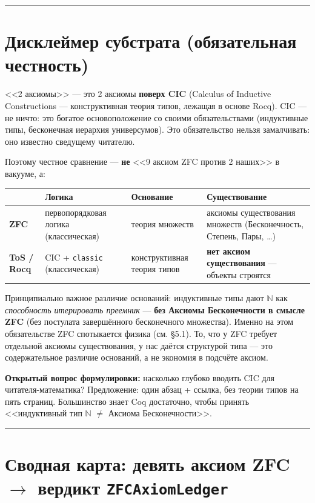 \documentclass[11pt,a4paper]{article}
\begin{document}
\bigskip\hrule\bigskip

\section{Дисклеймер субстрата (обязательная честность)}

<<2 аксиомы>> --- это 2 аксиомы \textbf{поверх CIC} (Calculus of Inductive Constructions --- конструктивная теория типов, лежащая в основе Rocq). CIC --- не ничто: это богатое основоположение со своими обязательствами (индуктивные типы, бесконечная иерархия универсумов). Это обязательство нельзя замалчивать: оно известно сведущему читателю.

Поэтому честное сравнение --- \textbf{не} <<9 аксиом ZFC против 2 наших>> в вакууме, а:

{\scriptsize\setlength{\tabcolsep}{4pt}\renewcommand{\arraystretch}{1.2}\begin{tabularx}{\linewidth}{|X|X|X|X|}
\hline
\textbf{} & \textbf{Логика} & \textbf{Основание} & \textbf{Существование} \\ \hline
\textbf{ZFC} & первопорядковая логика (классическая) & теория множеств & аксиомы существования множеств (Бесконечность, Степень, Пары, \ldots{}) \\ \hline
\textbf{ToS / Rocq} & CIC + \texttt{classic} (классическая) & конструктивная теория типов & \textbf{нет аксиом существования} --- объекты строятся \\ \hline
\end{tabularx}}

Принципиально важное различие оснований: индуктивные типы дают $\mathbb{N}$ как \emph{способность итерировать преемник} --- \textbf{без Аксиомы Бесконечности в смысле ZFC} (без постулата завершённого бесконечного множества). Именно на этом обязательстве ZFC спотыкается физика (см. \S{}5.1). То, что у ZFC требует отдельной аксиомы существования, у нас даётся структурой типа --- это содержательное различие оснований, а не экономия в подсчёте аксиом.

\textbf{Открытый вопрос формулировки:} насколько глубоко вводить CIC для читателя-математика? Предложение: один абзац + ссылка, без теории типов на пять страниц. Большинство знает Coq достаточно, чтобы принять <<индуктивный тип $\mathbb{N}$ $\ne$ Аксиома Бесконечности>>.

\bigskip\hrule\bigskip

\section{Сводная карта: девять аксиом ZFC $\to$ вердикт \texttt{ZFCAxiom\allowbreak{}Ledger}}
\end{document}
